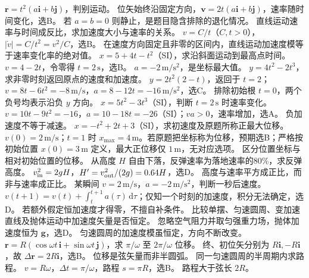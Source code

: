 \problemtext $\bm r=t^2(a\bm i+b\bm j)$，判别运动。
\workings 位矢始终沿固定方向，$\bm v=2t(a\bm i+b\bm j)$，速率随时间变化，选B。
\crosscheck 若 $a=b=0$ 则静止，是题目隐含排除的退化情况。
\problemtext 直线运动速率与时间成反比，求加速度大小与速率的关系。
\workings $v=C/t$（$C,t>0$），$|\dot v|=C/t^2=v^2/C$，选B。
\crosscheck 在速度方向固定且非零的区间内，直线运动加速度模等于速率变化率的绝对值。
\problemtext $x=5+4t-t^2$（SI），求沿斜面运动到最高点时间。
\workings $v=4-2t$，令零得 $t=2\,\mathrm s$，选B。
\crosscheck $a=-2\,\mathrm{m/s^2}$，是坐标最大值。
\problemtext $y=4t^2-2t^3$，求非零时刻返回原点的速度和加速度。
\workings $y=2t^2(2-t)$，返回于 $t=2$；$v=8t-6t^2=-8\,\mathrm{m/s}$，$a=8-12t=-16\,\mathrm{m/s^2}$，选C。
\crosscheck 排除初始根 $t=0$，两个负号均表示沿负 $y$ 方向。
\problemtext $x=5t^2-3t^3$（SI），判断 $t=2\,\mathrm s$ 时速率变化。
\workings $v=10t-9t^2=-16$，$a=10-18t=-26$（SI）；$va>0$，速率增加，选A。
\crosscheck 负加速度不等于减速。
\problemtext $x=-t^2+2t+3$（SI），求初速度及原题所称正最大位移。
\workings $v(0)=2\,\mathrm{m/s}$；$t=1$ 时 $x_{\max}=4\,\mathrm m$。若原题把坐标称为位移，预期选B；严格按初始位置 $x(0)=3\,\mathrm m$ 定义，最大正位移仅 $1\,\mathrm m$，无对应选项。
\crosscheck 区分位置坐标与相对初始位置的位移。
\problemtext 从高度 $H$ 自由下落，反弹速率为落地速率的80\%，求反弹高度。
\workings $v_{\rm in}^2=2gH$，$H'=v_{\rm out}^2/(2g)=0.64H$，选D。
\crosscheck 高度与速率平方成正比，而非与速率成正比。
\problemtext 某瞬间 $v=2\,\mathrm{m/s}$，$a=-2\,\mathrm{m/s^2}$，判断一秒后速度。
\workings $v(t+1)=v(t)+\int_t^{t+1}a(\tau)\,\mathrm d\tau$；仅知一个时刻的加速度，积分无法确定，选D。
\crosscheck 若额外假定恒加速度才得零，不擅自补条件。
\problemtext 比较单摆、匀速圆周、变加速直线及抛体运动中加速度矢量是否恒定。
\workings 忽略空气阻力并取匀强重力场，抛体加速度恒为 $\bm g$，选D。
\crosscheck 匀速圆周的加速度模虽恒定，方向不断改变。
\problemtext $\bm r=R(\cos\omega t\,\bm i+\sin\omega t\,\bm j)$，求 $\pi/\omega$ 至 $2\pi/\omega$ 位移。
\workings 终、初位矢分别为 $R\bm i,-R\bm i$，故 $\Delta\bm r=2R\bm i$，选B。
\crosscheck 位移是弦矢量而非半圆弧。
\problemtext 同一匀速圆周的半周期内求路程。
\workings $v=R\omega$，$\Delta t=\pi/\omega$，路程 $s=\pi R$，选B。
\crosscheck 路程大于弦长 $2R$。
